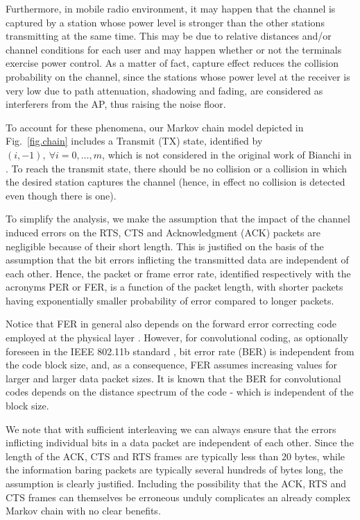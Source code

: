 \documentclass[10pt,onecolumn,a4paper]{IEEEtran}
\begin{document}
Furthermore, in mobile radio environment, it may happen that the
channel is captured by a station whose power level is stronger
than the other stations transmitting at the same time. This may be
due to relative distances and/or channel conditions for each user
and may happen whether or not the terminals exercise power
control. As a matter of fact, capture effect reduces the collision
probability on the channel, since the stations whose power level
at the receiver is very low due to path attenuation, shadowing and
fading, are considered as interferers from the AP, thus raising
the noise floor.

To account for these phenomena, our Markov chain model depicted in
Fig.~\ref{fig.chain} includes a Transmit (TX) state, identified by
$(i,-1),~\forall i=0,\ldots,m$, which is not considered in the
original work of Bianchi in \cite{Bianchi}. To reach the transmit state,
there should be no collision or a collision in which the desired station captures
the channel (hence, in effect no collision is detected even though there is one).

To simplify the analysis, we make the assumption that the impact
of the channel induced errors on the RTS, CTS and Acknowledgment
(ACK) packets are negligible because of their short length. This
is justified on the basis of the assumption that the bit errors
inflicting the transmitted data are independent of each other.
Hence, the packet or frame error rate, identified respectively
with the acronyms PER or FER, is a function of the packet length,
with shorter packets having exponentially smaller probability of
error compared to longer packets.

Notice that FER in general also depends on the forward error
correcting code employed at the physical layer
\cite{laddomada_3,laddomada_4}. However, for convolutional coding,
as optionally foreseen in the IEEE 802.11b standard
\cite{standard_DCF_MAC}, bit error rate (BER) is independent from
the code block size, and, as a consequence, FER assumes increasing
values for larger and larger data packet sizes. It is known
that the BER for convolutional codes depends on the distance
spectrum of the code \cite{proakis}-\cite{laddomada_2} which is
independent of the block size.

We note that with sufficient interleaving we can always ensure
that the errors inflicting individual bits in a data packet are
independent of each other. Since the length of the ACK, CTS and
RTS frames are typically less than 20 bytes, while the information
baring packets are typically several hundreds of bytes long, the
assumption is clearly justified. Including the possibility that
the ACK, RTS and CTS frames can themselves be erroneous unduly
complicates an already complex Markov chain with no clear
benefits.
\end{document}
